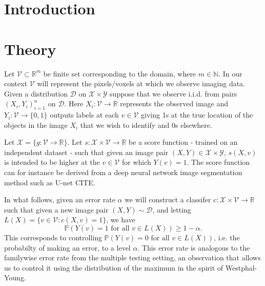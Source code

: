 \section{Introduction}
\section{Theory}
Let $\mathcal{V} \subset \mathbb{R}^m$ be finite set corresponding to the domain, where $m \in \mathbb{N}$. In our context $\mathcal{V}$ will represent the pixels/voxels at which we observe imaging data. Given a distribution $\mathcal{D}$ on $\mathcal{X} \times \mathcal{Y}$ suppose that we observe
i.i.d. from pairs $(X_i, Y_i)_{i = 1}^n$ on $\mathcal{D}$.  Here $X_i: \mathcal{V} \rightarrow \mathbb{R}$ represents the observed image and $Y_i:\mathcal{V} \rightarrow \lbrace 0, 1\rbrace$ outputs labels at each $v \in \mathcal{V}$ giving 1s at the true location of the objects in the image $X_i$ that we wish to identify and 0s elsewhere.

Let $\mathcal{X} = \lbrace g: \mathcal{V} \rightarrow \mathbb{R}\rbrace$. Let $s:\mathcal{X} \times \mathcal{V} \rightarrow \mathbb{R}$ be a score function - trained on an independent dataset - such that given an image pair $(X,Y) \in \mathcal{X}\times \mathcal{Y}$, $s(X, v)$ is intended to be higher at the $v \in \mathcal{V}$ for which $Y(v) = 1$. The score function can for instance be derived from a deep neural network image segmentation method such as U-net CITE.

In what follows, given an error rate $\alpha$ we will construct a classifer $c: \mathcal{X} \times \mathcal{V} \rightarrow \mathbb{R} $ such that given a new image pair $(X,Y) \sim \mathcal{D}$, and letting $L(X) = \lbrace v \in \mathcal{V}: c(X,v) = 1\rbrace$, we have
\begin{equation*}
	\mathbb{P}\left( Y(v) = 1 \text{ for all } v \in L(X) \right) \geq 1 - \alpha.
\end{equation*}
This corresponds to controlling  $\mathbb{P}\left( Y(v) = 0 \text{ for all } v \in L(X) \right) $, i.e. the probabilty of making an error, to a level $\alpha.$ This error rate is analogous to the familywise error rate from the multiple testing setting, an observation that allows us to control it using the distribution of the maximum in the spirit of Westphal-Young. 


